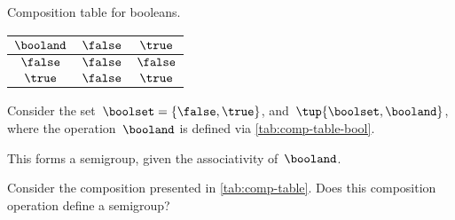 \begin{margintable}
    \caption{Composition table for booleans.}
    \label{tab:comp-table-bool}
    \centering
    \begin{tabular}{c|cc}
        $\booland$ & $\false$ & $\true$ \\
        \hline
        $\false$   & $\false$ & $\false$ \\
        $\true$    & $\false$ & $\true$
    \end{tabular}
\end{margintable}

\begin{example}[Booleans]
    \label{exa:booleans-table}
    \label{ex:bool_semigroup}
    Consider the set~$\boolset=\{\false, \true\}$, and~$\tup{\boolset,\booland}$, where the operation~$\booland$ is defined via \cref{tab:comp-table-bool}.

    This forms a semigroup, given the associativity of~$\booland$.
\end{example}

\begin{gradedexercise}
    \label{ex:CompositionTable}
    Consider the composition presented in \cref{tab:comp-table}.
    Does this composition operation define a semigroup?
\end{gradedexercise}

